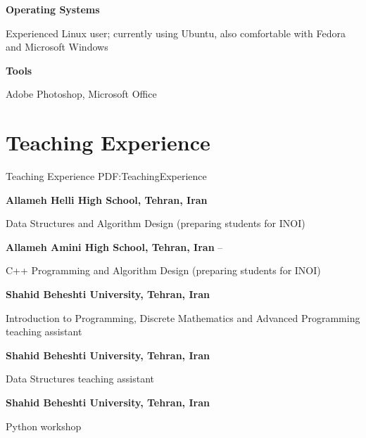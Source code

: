 \documentclass[a4paper,10pt,oneside]{article}
\begin{document}
\begin{body}
\EntryGap
{\textbf{Operating Systems}}
\hfill
\par
Experienced Linux user; currently using Ubuntu, also comfortable with Fedora and Microsoft Windows
\begin{detail}
\end{detail}

\EntryGap
{\textbf{Tools}}
\hfill
\par
Adobe Photoshop, Microsoft Office
\begin{detail}
\end{detail}



\section
{Teaching Experience}
{Teaching Experience}
{PDF:TeachingExperience}

{\textbf{Allameh Helli High School, Tehran, Iran}}
\hfill
{}
\par
Data Structures and Algorithm Design (preparing students for INOI)
\begin{detail}
\end{detail}

\EntryGap
{\textbf{Allameh Amini High School, Tehran, Iran}}
\hfill
{} --
\par
C++ Programming and Algorithm Design (preparing students for INOI)
\begin{detail}
\end{detail}

\EntryGap
{\textbf{Shahid Beheshti University, Tehran, Iran}}
\hfill
{}
\par
Introduction to Programming, Discrete Mathematics and Advanced Programming teaching assistant
\begin{detail}
\end{detail}

\EntryGap
{\textbf{Shahid Beheshti University, Tehran, Iran}}
\hfill
{}
\par
Data Structures teaching assistant
\begin{detail}
\end{detail}

\EntryGap
{\textbf{Shahid Beheshti University, Tehran, Iran}}
\hfill
{}
\par
Python workshop
\begin{detail}
\end{detail}


\end{body}
\end{document}

